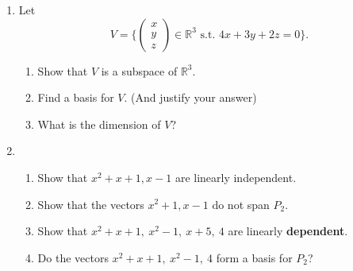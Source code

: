 \documentclass{article}
\begin{document}
\begin{enumerate}
\newpage
\item Let  \[ V = \{ \begin{pmatrix} x \\ y \\ z \end{pmatrix}\in \mathbb{R}^3 \text{ s.t. } 4x+3y+2z =0\}.\]
\begin{enumerate}
\item Show that $V$ is a subspace of $\mathbb{R}^3$.
\item Find a basis for $V$. (And justify your answer)
\item What is the dimension of $V$?
\end{enumerate}

\newpage
\item \begin{enumerate}
\item Show that $ x^2+x+1, x-1 $ are linearly independent.
\item Show that the vectors $ x^2+1, x-1 $ do not span $P_2$.
\item Show that $ x^2+x+1,~ x^2-1, ~x+5, ~4 $ are linearly \textbf{dependent}.
\item Do the vectors $ x^2+x+1,~ x^2-1, ~4 $ form a basis for $P_2$? 
\end{enumerate}

\newpage
\
\newpage
\
	\thispagestyle{empty}

	\thispagestyle{empty}
\end{enumerate}
\end{document}

